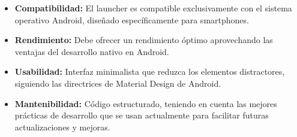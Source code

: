 \begin{itemize}
    \item \textbf{Compatibilidad:} El launcher es compatible exclusivamente con el sistema operativo Android, diseñado específicamente para smartphones.
    
    \item \textbf{Rendimiento:} Debe ofrecer un rendimiento óptimo aprovechando las ventajas del desarrollo nativo en Android.
    
    \item \textbf{Usabilidad:} Interfaz minimalista que reduzca los elementos distractores, siguiendo las directrices de Material Design de Android.
    
    \item \textbf{Mantenibilidad:} Código estructurado, teniendo en cuenta las mejores prácticas de desarrollo que se usan actualmente para facilitar futuras actualizaciones y mejoras.
\end{itemize}
